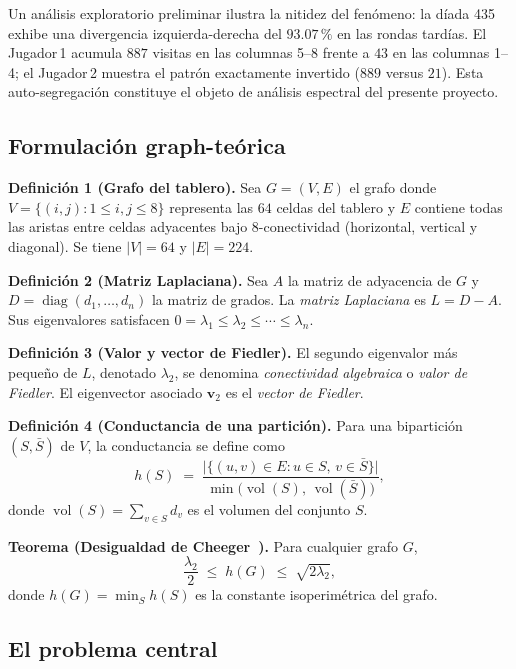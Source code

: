 \documentclass[journal]{IEEEtran}
\begin{document}
Un análisis exploratorio preliminar ilustra la nitidez del fenómeno: la díada
435 exhibe una divergencia izquierda-derecha del $93.07\,\%$ en las
rondas tardías. El Jugador\,1 acumula $887$ visitas en las columnas 5--8 frente a $43$
en las columnas 1--4; el Jugador\,2 muestra el patrón exactamente invertido ($889$
versus $21$). Esta auto-segregación constituye el objeto de análisis espectral del
presente proyecto.

\subsection{Formulación graph-teórica}

\textbf{Definición 1 (Grafo del tablero).}
Sea $G=(V,E)$ el grafo donde $V=\{(i,j):1\le i,j\le 8\}$ representa las $64$ celdas
del tablero y $E$ contiene todas las aristas entre celdas adyacentes bajo
\mbox{8-conectividad} (horizontal, vertical y diagonal). Se tiene $|V|=64$ y
$|E|=224$.

\textbf{Definición 2 (Matriz Laplaciana).}
Sea $A$ la matriz de adyacencia de $G$ y $D=\operatorname{diag}(d_1,\ldots,d_n)$ la
matriz de grados. La \emph{matriz Laplaciana} es $L=D-A$. Sus eigenvalores satisfacen
$0=\lambda_1\le\lambda_2\le\cdots\le\lambda_n$.

\textbf{Definición 3 (Valor y vector de Fiedler).}
El segundo eigenvalor más pequeño de $L$, denotado $\lambda_2$, se denomina
\emph{conectividad algebraica} o \emph{valor de Fiedler}. El eigenvector asociado
$\mathbf{v}_2$ es el \emph{vector de Fiedler}.

\textbf{Definición 4 (Conductancia de una partición).}
Para una bipartición $(S,\bar{S})$ de $V$, la conductancia se define como
\begin{equation}
  h(S) \;=\;
  \frac{\bigl|\{(u,v)\in E : u\in S,\,v\in\bar{S}\}\bigr|}
       {\min\!\bigl(\operatorname{vol}(S),\,\operatorname{vol}(\bar{S})\bigr)},
\end{equation}
donde $\operatorname{vol}(S)=\sum_{v\in S}d_v$ es el volumen del conjunto $S$.

\textbf{Teorema (Desigualdad de Cheeger~\cite{chung1997}).}
Para cualquier grafo $G$,
\begin{equation}
  \frac{\lambda_2}{2} \;\le\; h(G) \;\le\; \sqrt{2\lambda_2},
\end{equation}
donde $h(G)=\min_S h(S)$ es la constante isoperimétrica del grafo.

\subsection{El problema central}
\end{document}
